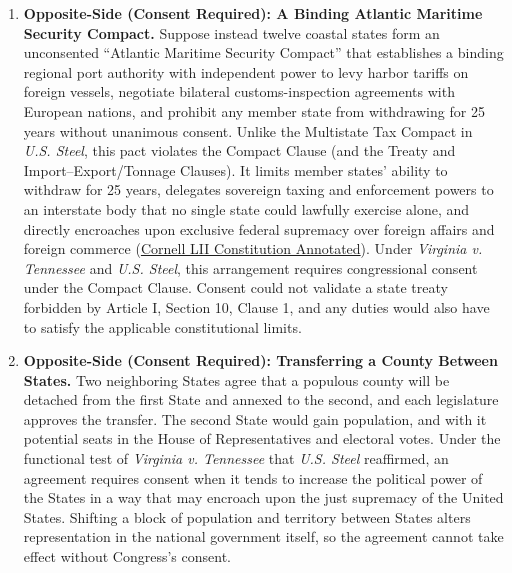 \documentclass[12pt]{article}
\begin{document}
\begin{enumerate}
\item \textbf{Opposite-Side (Consent Required): A Binding Atlantic Maritime Security Compact.} Suppose instead twelve coastal states form an unconsented ``Atlantic Maritime Security Compact'' that establishes a binding regional port authority with independent power to levy harbor tariffs on foreign vessels, negotiate bilateral customs-inspection agreements with European nations, and prohibit any member state from withdrawing for 25 years without unanimous consent. Unlike the Multistate Tax Compact in \textit{U.S. Steel}, this pact violates the Compact Clause (and the Treaty and Import--Export/Tonnage Clauses). It limits member states' ability to withdraw for 25 years, delegates sovereign taxing and enforcement powers to an interstate body that no single state could lawfully exercise alone, and directly encroaches upon exclusive federal supremacy over foreign affairs and foreign commerce (\href{https://www.law.cornell.edu/constitution-conan/article-1/section-1/clause-3/requirement-of-congressional-consent-to-compacts}{Cornell LII Constitution Annotated}). Under \textit{Virginia v. Tennessee} and \textit{U.S. Steel}, this arrangement requires congressional consent under the Compact Clause. Consent could not validate a state treaty forbidden by Article I, Section 10, Clause 1, and any duties would also have to satisfy the applicable constitutional limits.

\item \textbf{Opposite-Side (Consent Required): Transferring a County Between States.} Two neighboring States agree that a populous county will be detached from the first State and annexed to the second, and each legislature approves the transfer. The second State would gain population, and with it potential seats in the House of Representatives and electoral votes. Under the functional test of \textit{Virginia v. Tennessee} that \textit{U.S. Steel} reaffirmed, an agreement requires consent when it tends to increase the political power of the States in a way that may encroach upon the just supremacy of the United States. Shifting a block of population and territory between States alters representation in the national government itself, so the agreement cannot take effect without Congress's consent.


\end{enumerate}
\end{document}
